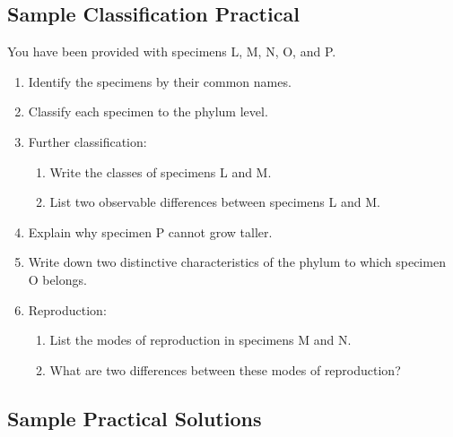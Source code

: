 \subsection{Sample Classification Practical}

You have been provided with specimens L, M, N, O, and P.
\begin{enumerate}
\item{Identify the specimens by their common names.}
\item{Classify each specimen to the phylum level.}	
\item{Further classification:}
\begin{enumerate}
\item{Write the classes of specimens L and M.}
\item{List two observable differences between specimens L and M.}
\end{enumerate}
\item{Explain why specimen P cannot grow taller.}
\item{Write down two distinctive characteristics of the phylum to which specimen O belongs.}
\item{Reproduction:}
\begin{enumerate}
\item{List the modes of reproduction in specimens M and N.}
\item{What are two differences between these modes of reproduction?}
\end{enumerate}
\end{enumerate}

\subsection{Sample Practical Solutions}

